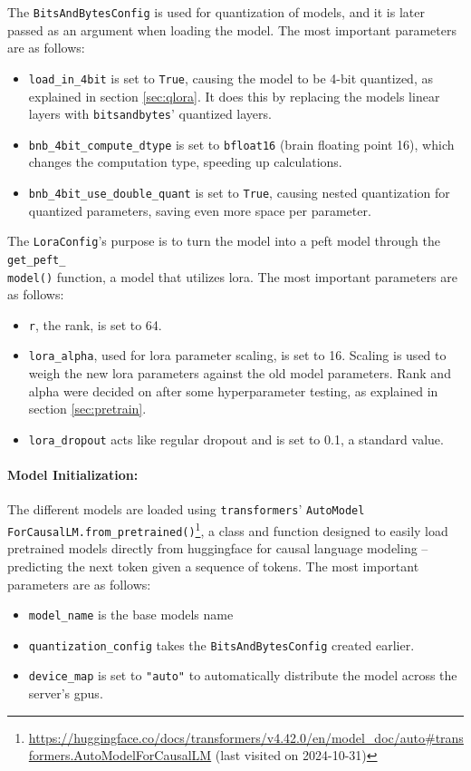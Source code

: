 The \texttt{BitsAndBytesConfig} is used for quantization of models, and it is later passed as an argument when loading the model.
The most important parameters are as follows:
\begin{itemize}
    \item \texttt{load\_in\_4bit} is set to \texttt{True}, causing the model to be 4-bit quantized, as explained in section \ref{sec:qlora}. It does this by replacing the models linear layers with \texttt{bitsandbytes}' quantized layers.
    \item \texttt{bnb\_4bit\_compute\_dtype} is set to \texttt{bfloat16} (brain floating point 16), which changes the computation type, speeding up calculations.
    \item \texttt{bnb\_4bit\_use\_double\_quant} is set to \texttt{True}, causing nested quantization for quantized parameters, saving even more space per parameter.
\end{itemize}

The \texttt{LoraConfig}'s purpose is to turn the model into a \ac{peft} model through the \texttt{get\_peft\_\\model()} function, a model that utilizes \ac{lora}.
The most important parameters are as follows:
\begin{itemize}
    \item \texttt{r}, the rank, is set to 64.
    \item \texttt{lora\_alpha}, used for \ac{lora} parameter scaling, is set to 16. Scaling is used to weigh the new \ac{lora} parameters against the old model parameters. Rank and alpha were decided on after some hyperparameter testing, as explained in section \ref{sec:pretrain}.
    \item \texttt{lora\_dropout} acts like regular dropout and is set to 0.1, a standard value.
\end{itemize}

\paragraph{Model Initialization:}
The different models are loaded using \texttt{transformers}' \texttt{AutoModel\\ForCausalLM.from\_pretrained()}\footnote{\url{https://huggingface.co/docs/transformers/v4.42.0/en/model_doc/auto\#transformers.AutoModelForCausalLM} (last visited on 2024-10-31)}, a class and function designed to easily load pretrained models directly from huggingface for causal language modeling -- predicting the next token given a sequence of tokens.
The most important parameters are as follows:
\begin{itemize}
    \item \texttt{model\_name} is the base models name
    \item \texttt{quantization\_config} takes the \texttt{BitsAndBytesConfig} created earlier.
    \item \texttt{device\_map} is set to \texttt{"auto"} to automatically distribute the model across the server's \acp{gpu}.
\end{itemize}

